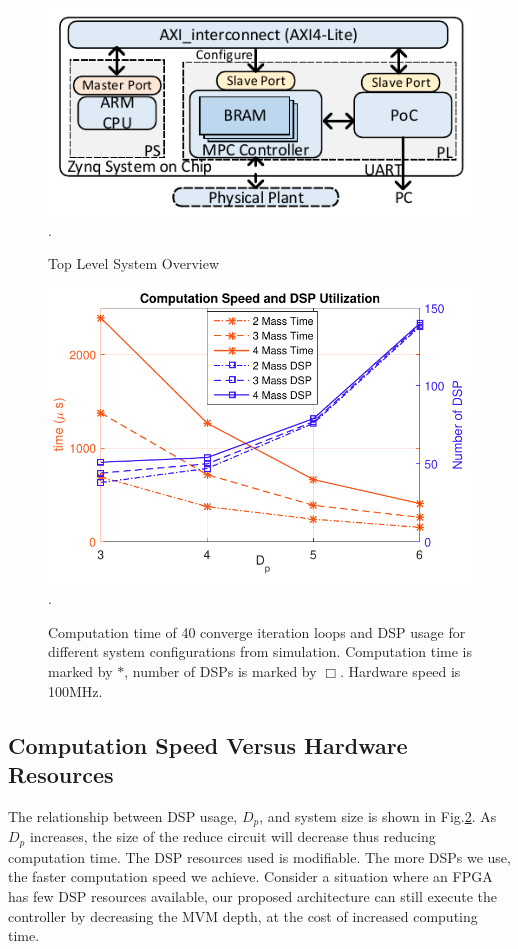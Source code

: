 \begin{figure}[t]
\centering
\captionsetup{justification=centering}
\includegraphics[scale=.84]{../figure/copro.pdf}
\DeclareGraphicsExtensions.
\caption{Top Level System Overview\label{fig_copro}}
\end{figure}


\begin{figure}[t]
\centering
\captionsetup{justification=centering}
\includegraphics[scale=.65]{../figure/dsp.pdf}
\DeclareGraphicsExtensions.
\caption{Computation time of 40 converge iteration loops and DSP usage for different system configurations from simulation. Computation time is marked by $\ast$, number of DSPs is marked by $\Box$. Hardware speed is 100MHz.\label{fig_ct}}
\end{figure}

\subsection{Computation Speed Versus Hardware Resources}
The relationship between DSP usage, $D_p$, and system size is shown in Fig.\cref{fig_ct}. As $D_p$ increases, the size of the reduce circuit will decrease thus reducing computation time. The DSP resources used is modifiable. The more DSPs we use, the faster computation speed we achieve. Consider a situation where an FPGA has few DSP resources available, our proposed architecture can still execute the controller by decreasing the MVM depth, at the cost of increased computing time.\par

